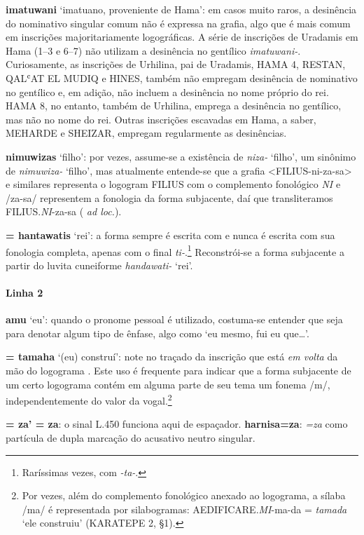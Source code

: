 \noindent\textbf{imatuwani} `imatuano, proveniente de Hama': em casos muito raros, a
desinência do nominativo singular comum não é expressa na grafia, algo que é
mais comum em inscrições majoritariamente logográficas. A série de inscrições de
Uradamis em Hama (1--3 e 6--7) não utilizam a desinência no gentílico
\emph{imatuwani-}.
Curiosamente, as inscrições de Urhilina, pai de Uradamis, HAMA 4,
RESTAN, QALʿAT EL MUDIQ e HINES,
também não empregam desinência de nominativo no gentílico e, em adição, não
incluem a desinência no nome próprio do rei.
HAMA 8, no entanto, também de Urhilina, emprega a desinência no gentílico, mas
não no nome do rei.
Outras inscrições escavadas em Hama, a saber, MEHARDE e SHEIZAR, empregam
regularmente as desinências.

\noindent\textbf{nimuwizas} `filho': por vezes, assume-se a existência de \emph{niza-}
`filho', um sinônimo de \emph{nimuwiza-} `filho', mas atualmente entende-se que
a grafia <FILIUS-ni-za-sa> e similares representa o logogram FILIUS com o
complemento fonológico \emph{NI} e /za-sa/ representem a fonologia da forma
subjacente, daí que transliteramos FILIUS.\emph{NI}-za-sa
( \emph{ad loc.}).

\noindent{} \textbf{= hantawatis} `rei': a forma sempre é escrita com  e
nunca é escrita com sua fonologia completa,
apenas com o final \emph{ti-}.\footnote{Raríssimas vezes, com \emph{-ta-}.}
Reconstrói-se a forma subjacente a partir do luvita cuneiforme
\emph{handawati-} `rei'.

\paragraph{Linha 2}
\textbf{amu} `eu': quando o pronome pessoal é utilizado, costuma-se entender que
seja para denotar algum tipo de ênfase, algo como `eu mesmo, fui eu que\ldots{}'.

\noindent{} \textbf{= tamaha} `(eu) construí': note no
traçado da inscrição que  está \emph{em volta} da mão do
logograma . Este uso é frequente para indicar que a
forma subjacente de um certo logograma contém em alguma parte de seu tema um
fonema /m/, independentemente do valor da vogal.\footnote{Por vezes, além
	do complemento fonológico anexado ao logograma, a sílaba /ma/ é representada
	por silabogramas: AEDIFICARE.\emph{MI}-ma-da = \emph{tamada} `ele construiu'
	(KARATEPE 2, §1).}

\noindent{} \textbf{= za' = za}: o sinal L.450  funciona
aqui de espaçador.
\textbf{harnisa=za}: \emph{=za} como partícula de dupla marcação do acusativo
neutro singular.

